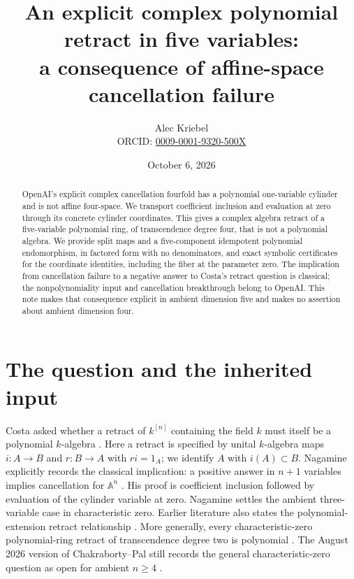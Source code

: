 \documentclass[11pt]{article}
\title{An explicit complex polynomial retract in five variables:\\a consequence of affine-space cancellation failure}
\author{Alec Kriebel\\\small ORCID: \href{https://orcid.org/0009-0001-9320-500X}{0009-0001-9320-500X}}
\date{October 6, 2026}
\newcommand{\A}{\mathbb A}
\begin{document}
\maketitle
\begin{abstract}
OpenAI's explicit complex cancellation fourfold has a polynomial
one-variable cylinder and is not affine four-space. We transport coefficient
inclusion and evaluation at zero through its concrete cylinder coordinates.
This gives a complex algebra retract of a five-variable polynomial ring,
of transcendence degree four, that is not a polynomial algebra. We provide
split maps and a five-component idempotent polynomial endomorphism, in
factored form with no denominators, and exact symbolic certificates for
the coordinate identities, including the fiber at the parameter zero.
The implication from cancellation failure to a negative answer to Costa's
retract question is classical; the nonpolynomiality input and cancellation
breakthrough belong to OpenAI. This note makes that consequence explicit
in ambient dimension five and makes no assertion about ambient dimension four.
\end{abstract}

\section{The question and the inherited input}
Costa asked whether a retract of $k^{[n]}$ containing the field $k$ must
itself be a polynomial $k$-algebra \cite{Costa}. Here a retract is specified
by unital $k$-algebra maps $i:A\to B$ and $r:B\to A$ with $r i=1_A$;
we identify $A$ with $i(A)\subset B$. Nagamine explicitly records the
classical implication: a positive answer in $n+1$ variables implies
cancellation for $\A^n$ \cite[Proposition 1.4]{Nagamine}. His proof is
coefficient inclusion followed by evaluation of the cylinder variable at zero.
Nagamine settles the ambient three-variable case in characteristic zero.
Earlier literature also states the polynomial-extension retract relationship
\cite[Introduction]{EN}. More generally, every characteristic-zero polynomial-ring retract of
transcendence degree two is polynomial \cite[Theorem 5.8]{CDDG}.
The August 2026 version of Chakraborty--Pal still records the general
characteristic-zero question as open for ambient $n\geq4$ \cite{CP}.
\end{document}
